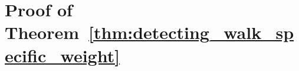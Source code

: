 \section{Proof of Theorem~\ref{thm:detecting_walk_specific_weight}}
\label{regexp:sec:paths-in-graph}


\BiblatexSplitbibDefernumbersWarningOff

\backmatter
{}
\printbibliography[heading=subbibintoc]
